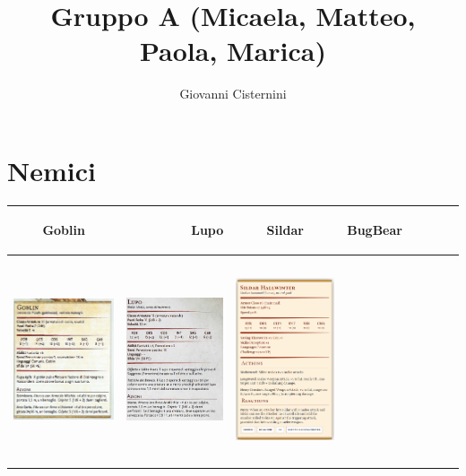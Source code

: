 \documentclass{article}
\title{Gruppo A (Micaela, Matteo, Paola, Marica)}
\author{Giovanni Cisternini}
\begin{document}
\tableofcontents

\maketitle


\section{Nemici}
\begin{table}[h]
    \centering
    \begin{tabular}{cr|cr|cr|cr}
         \hypertarget{goblin}{Goblin}& \hypertarget{lupo}{Lupo} &\hypertarget{sildar}{Sildar}&\hypertarget{bugbear}{BugBear}\\
         \hline
           \includegraphics[width=4cm,height=6cm]{../Mostri/Goblin.png}  & \includegraphics[width=4cm,height=6cm]{../Mostri/Lupo.png} & \includegraphics[width=4cm,height=6cm]{../PNG/Sildar_Hallwinter.png}&

\end{tabular}
\end{table}
\end{document}
